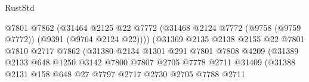 \begin{lexlean}{RustStd}
\begin{coremodule}
                                          @7801
                                          @7862
                                          (@31464
                                            @2125
                                            @22
                                            @7772
                                            (@31468
                                              @2124
                                              @7772
                                              (@9758 (@9759 @7772))
                                              (@9391 (@9764 @2124 @22))))
                                          (@31369
                                            @2135
                                            @2138
                                            @2155
                                            @22
                                            @7801
                                            @7810
                                            @2717
                                            @7862
                                            (@31380
                                              @2134
                                              @1301
                                              @291
                                              @7801
                                              @7808
                                              @4209
                                              (@31389
                                                @2133
                                                @648
                                                @1250
                                                @3142
                                                @7800
                                                @7807
                                                @2705
                                                @7778
                                                @2711
                                                @31409
                                                (@31388
                                                  @2131
                                                  @158
                                                  @648
                                                  @27
                                                  @7797
                                                  @2717
                                                  @2730
                                                  @2705
                                                  @7788
                                                  @2711

\end{coremodule}
\end{lexlean}
